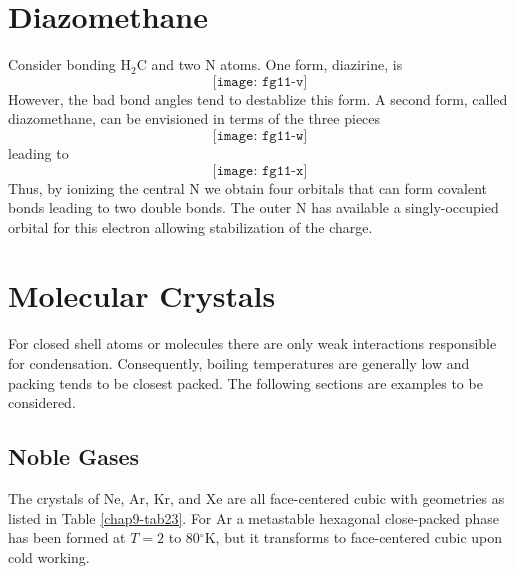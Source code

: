 \section{Diazomethane}

Consider bonding H$_2$C and two N atoms.  One form, diazirine, is
\begin{equation}
\texttt{[image: fg11-v]}
\end{equation}
However, the bad bond angles tend to destablize this form.  A second 
form, called diazomethane, can be envisioned in terms of the three pieces
\begin{equation}
\texttt{[image: fg11-w]}
\end{equation}
leading to
\begin{equation}
\texttt{[image: fg11-x]}
\end{equation}
Thus, by ionizing the central N we obtain four orbitals that can form 
covalent bonds leading to two double bonds.  The outer N has available 
a singly-occupied orbital for this electron allowing stabilization of 
the charge.


\section{Molecular Crystals}

For closed shell atoms or molecules there are only weak interactions
responsible for condensation.  Consequently, boiling temperatures are
generally low and packing tends to be closest packed.  The following
sections are examples to be considered.

\subsection{Noble Gases}

The crystals of Ne, Ar, Kr, and Xe are all face-centered cubic with 
geometries as listed in Table \ref{chap9-tab23}.  For Ar a metastable hexagonal 
close-packed phase has been formed at $T = 2$ to 80$^{\circ}$K, but it 
transforms to face-centered cubic upon cold working.

